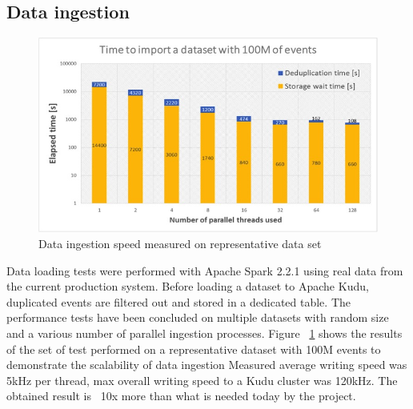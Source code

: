 \documentclass{webofc}
\begin{document}
\begin{linenumbers}
\subsection{Data ingestion}
\label{sec-6-di}
\begin{figure}
\centering
\includegraphics[width=\linewidth,clip]{ingestion.jpg}
\caption{Data ingestion speed measured on representative data set}
\label{fig:ingestion}
\end{figure}
Data loading tests were performed with Apache Spark 2.2.1 using real data from the current production system.
Before loading a dataset to Apache Kudu, duplicated events are filtered out and stored in a dedicated table. The performance tests have been concluded on multiple datasets with random size and a various number of parallel ingestion processes. 
Figure ~\ref{fig:ingestion} shows the results of the set of test performed on a representative dataset with 100M events to demonstrate the scalability of data ingestion 
Measured average writing speed was 5kHz per thread, max overall writing speed to a Kudu cluster was 120kHz. The obtained result is ~10x more than what is needed today by the project.


\end{linenumbers}
\end{document}

